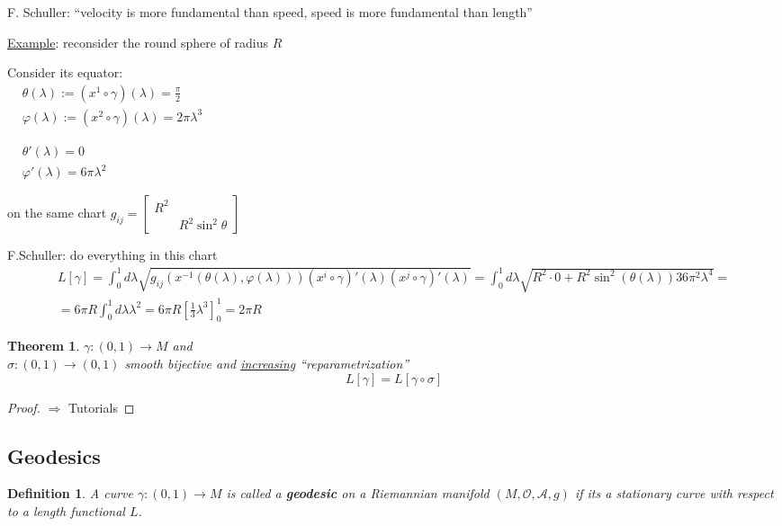 \documentclass[10pt, twoside]{amsart}
\newtheorem{theorem}{Theorem}
\newtheorem{definition}{Definition}
\begin{document}
\begin{multicols*}{2}
F. Schuller: ``velocity is more fundamental than speed, speed is more fundamental than length''

\underline{Example}: reconsider the round sphere of radius $R$

Consider its equator: \\
$\begin{aligned}
&  \theta(\lambda) := (x^1 \circ \gamma)(\lambda) = \frac{\pi}{2} \\ 
 & \varphi(\lambda) := (x^2 \circ \gamma)(\lambda) = 2\pi \lambda^3   
\end{aligned}$

$\begin{aligned}
  & \theta'(\lambda) = 0 \\
  & \varphi'(\lambda) = 6\pi\lambda^2 
\end{aligned}$

on the same chart $g_{ij} = \left[ \begin{matrix} R^2 & \\ 
    & R^2 \sin^2{\theta} \end{matrix} \right]$

F.Schuller: do everything in this chart
\[
\begin{gathered}
L[\gamma] = \int_0^1 d\lambda \sqrt{ g_{ij}(x^{-1}(\theta(\lambda) , \varphi(\lambda)))(x^i\circ \gamma)'(\lambda)(x^j\circ \gamma)'(\lambda) } = \int_0^1 d\lambda \sqrt{ R^2 \cdot 0 + R^2\sin^2{(\theta(\lambda))} 36 \pi^2 \lambda^4 } = \\
= 6\pi R \int_0^1 d\lambda \lambda^2 = 6\pi R [ \frac{1}{3} \lambda^3 ]^1_0 = 2\pi R
\end{gathered}
\]

\begin{theorem}
  $\gamma: (0,1) \to M$ and \\
$\sigma:(0,1) \to (0,1)$ smooth bijective and \underline{increasing} ``reparametrization''
\[
L[\gamma] = L[\gamma \circ \sigma]
\]
\end{theorem}
\begin{proof}
  $\Longrightarrow $ Tutorials
\end{proof}

\subsection{Geodesics}

\begin{definition}
  A curve $\gamma:(0,1) \to M$ is called a \textbf{geodesic} on a Riemannian manifold $(M,\mathcal{O}, \mathcal{A}, g)$ if its a \emph{stationary} curve with respect to a length functional $L$.  
\end{definition}


\end{multicols*}
\end{document}
